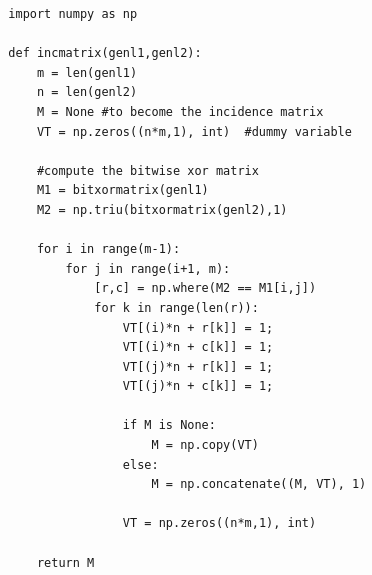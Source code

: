 \documentclass{article}
\begin{document}
  \begin{verbatim}
  import numpy as np

  def incmatrix(genl1,genl2):
      m = len(genl1)
      n = len(genl2)
      M = None #to become the incidence matrix
      VT = np.zeros((n*m,1), int)  #dummy variable

      #compute the bitwise xor matrix
      M1 = bitxormatrix(genl1)
      M2 = np.triu(bitxormatrix(genl2),1)

      for i in range(m-1):
          for j in range(i+1, m):
              [r,c] = np.where(M2 == M1[i,j])
              for k in range(len(r)):
                  VT[(i)*n + r[k]] = 1;
                  VT[(i)*n + c[k]] = 1;
                  VT[(j)*n + r[k]] = 1;
                  VT[(j)*n + c[k]] = 1;

                  if M is None:
                      M = np.copy(VT)
                  else:
                      M = np.concatenate((M, VT), 1)

                  VT = np.zeros((n*m,1), int)

      return M
  \end{verbatim}

  
  
\end{document}
